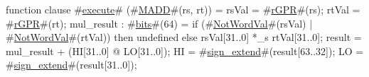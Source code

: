 function clause #\hyperref[zexecute]{execute}# (#\hyperref[zMADD]{MADD}#(rs, rt)) =
  {
    rsVal = #\hyperref[zrGPR]{rGPR}#(rs);
    rtVal = #\hyperref[zrGPR]{rGPR}#(rt);
    mul_result : #\hyperref[zbits]{bits}#(64) = if (#\hyperref[zNotWordVal]{NotWordVal}#(rsVal) | #\hyperref[zNotWordVal]{NotWordVal}#(rtVal)) then
        undefined
      else
	rsVal[31..0] *_s rtVal[31..0];
    result = mul_result + (HI[31..0] @ LO[31..0]);
    HI = #\hyperref[zsignzyextend]{sign\_extend}#(result[63..32]);
    LO = #\hyperref[zsignzyextend]{sign\_extend}#(result[31..0]);
  }

